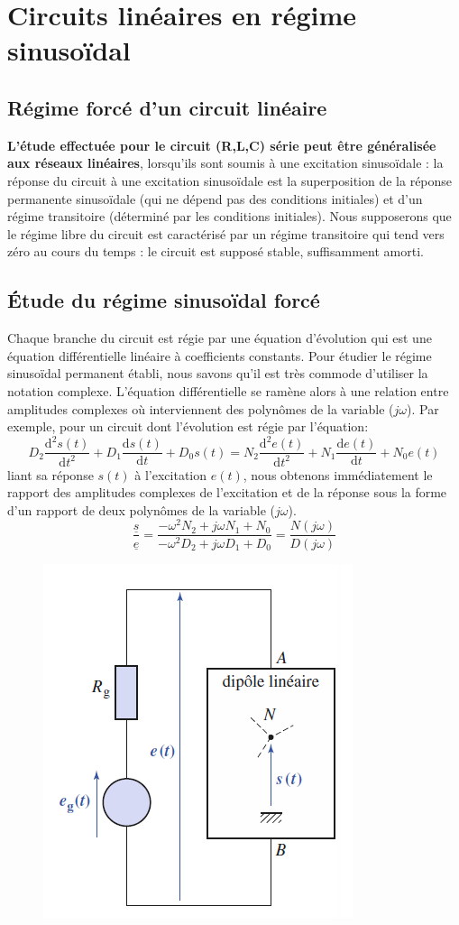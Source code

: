 \documentclass[12pt]{book}
\theoremstyle{definition}\newtheorem{dfn}{Définition}[chapter]
\theoremstyle{plain}\newtheorem{thm}{Théorème}[chapter]
\theoremstyle{plain}\newtheorem{prp}{Proposition}[chapter]
\theoremstyle{plain}\newtheorem{lem}{\bf Lemme}[chapter]
\theoremstyle{plain}\newtheorem{axm}{\bf Axiome}[chapter]
\theoremstyle{plain}\newtheorem{lmm}{\bf Lemme}[chapter]
\theoremstyle{plain}\newtheorem{cor}{\bf Corollaire}[chapter]
\theoremstyle{remark}\newtheorem{rem}{Remarque}[chapter]
\begin{document}
\section{Circuits linéaires en régime sinusoïdal}
\subsection{Régime forcé d’un circuit linéaire}
\textbf{L'étude effectuée pour le circuit (R,L,C) série peut être généralisée aux
	réseaux linéaires}, lorsqu'ils sont soumis à une excitation sinusoïdale : la
réponse du circuit à une excitation sinusoïdale est la superposition de la
réponse permanente sinusoïdale (qui ne dépend pas des conditions initiales) et
d'un régime transitoire (déterminé par les conditions initiales).
Nous supposerons que le régime libre du circuit est caractérisé par un régime
transitoire qui tend vers zéro au cours du temps : le circuit est supposé stable,
suffisamment amorti.
\subsection{Étude du régime sinusoïdal forcé}
Chaque branche du circuit est régie par une équation d'évolution qui est une
équation différentielle linéaire à coefficients constants. Pour étudier le régime
sinusoïdal permanent établi, nous savons qu'il est très commode d'utiliser la
notation complexe. L'équation différentielle se ramène alors à une relation
entre amplitudes complexes où interviennent des polynômes de la variable ($j\omega$).
Par exemple, pour un circuit dont l'évolution est régie par l'équation:
$$
D_2\frac{\mathrm{d^2}s(t)}{\mathrm{d}t^2}+D_1\frac{\mathrm{d}s(t)}{\mathrm{d}t}+D_0s(t)=N_2\frac{\mathrm{d^2}e(t)}{\mathrm{d}t^2}+N_1\frac{\mathrm{d}e(t)}{\mathrm{d}t}+N_0e(t)
$$
liant sa réponse $s(t)$ à l'excitation $e(t)$, nous obtenons immédiatement le rapport
des amplitudes complexes de l'excitation et de la réponse sous la forme
d'un rapport de deux polynômes de la variable ($j\omega$).
$$
\frac{\underline{s}}{\underline{e}}=\frac{-\omega^2N_2+j\omega N_1+N_0}{-\omega^2D_2+j\omega D_1+D_0}=\frac{N(j\omega)}{D(j\omega)}
$$

\begin{figure}[H]
	\centering
	\includegraphics[scale=1]{image//Etude du circuit RLC serie-Resonances//10}
\end{figure}
\end{document}
